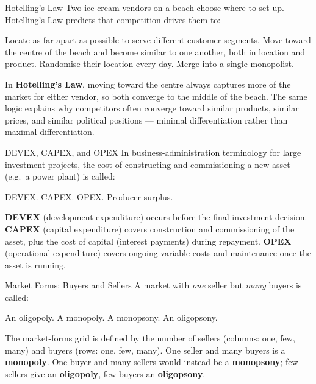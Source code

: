 \begin{question}[type=mc]{Hotelling's Law}
Two ice-cream vendors on a beach choose where to set up. Hotelling's Law
predicts that competition drives them to:
\begin{choices}
  \choice        Locate as far apart as possible to serve different customer
                 segments.
  \correctchoice Move toward the centre of the beach and become similar to
                 one another, both in location and product.
  \choice        Randomise their location every day.
  \choice        Merge into a single monopolist.
\end{choices}
\begin{solution}
  In \textbf{Hotelling's Law}, moving toward the centre always captures more
  of the market for either vendor, so both converge to the middle of the
  beach. The same logic explains why competitors often converge toward
  similar products, similar prices, and similar political positions —
  minimal differentiation rather than maximal differentiation.
\end{solution}
\end{question}

\begin{question}[type=mc]{DEVEX, CAPEX, and OPEX}
In business-administration terminology for large investment projects, the
cost of constructing and commissioning a new asset (e.g.\ a power plant) is
called:
\begin{choices}
  \choice        DEVEX.
  \correctchoice CAPEX.
  \choice        OPEX.
  \choice        Producer surplus.
\end{choices}
\begin{solution}
  \textbf{DEVEX} (development expenditure) occurs before the final investment
  decision. \textbf{CAPEX} (capital expenditure) covers construction and
  commissioning of the asset, plus the cost of capital (interest payments)
  during repayment. \textbf{OPEX} (operational expenditure) covers ongoing
  variable costs and maintenance once the asset is running.
\end{solution}
\end{question}

\begin{question}[type=mc]{Market Forms: Buyers and Sellers}
A market with \emph{one} seller but \emph{many} buyers is called:
\begin{choices}
  \choice        An oligopoly.
  \correctchoice A monopoly.
  \choice        A monopsony.
  \choice        An oligopsony.
\end{choices}
\begin{solution}
  The market-forms grid is defined by the number of sellers (columns: one,
  few, many) and buyers (rows: one, few, many). One seller and many buyers
  is a \textbf{monopoly}. One buyer and many sellers would instead be a
  \textbf{monopsony}; few sellers give an \textbf{oligopoly}, few buyers an
  \textbf{oligopsony}.
\end{solution}
\end{question}

